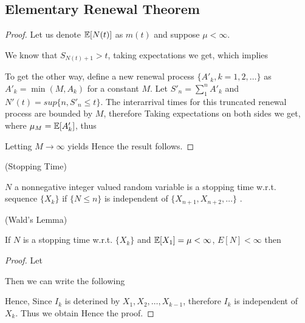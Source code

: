 \documentclass[all-lectures.tex]{subfiles}
\begin{document}
\subsection{Elementary Renewal Theorem}
\begin{thm}
\end{thm}

\begin{proof}
Let us denote $\mathbb{E}[N(t)]$ as $m(t)$ and suppose $\mu < \infty$.

We know that $S_{N(t)+1} > t$, taking expectations we get,
which implies 

To get the other way, define a new renewal process $\{ A'_k, k=1,2,\dots \}$ as $A'_k= \min(M,A_k)$ for a constant $M$.
Let $S'_n=\sum_1^n A'_k$ and $N'(t) = sup\{n,S'_n \le t\}$. The interarrival times for this truncated renewal process are bounded by $M$, therefore
Taking expectations on both sides we get,
where $\mu_M = \mathbb{E}[A'_k]$, thus

Letting $M \to \infty$ yields
Hence the result follows.
\end{proof}

\begin{defn}
(Stopping Time)

$N$ a nonnegative integer valued random variable is a stopping time w.r.t. sequence $\{X_k\}$ if $\{ N\le n\}$ is independent of $\{X_{n+1}, X_{n+2}, \dots\}$ .
\end{defn}

\begin{thm}
(Wald's Lemma)

If $N$ is a stopping time w.r.t. $\{X_k\}$ and $\mathbb{E}[X_1] = \mu < \infty$, $E[N] < \infty$ then
\end{thm}

\begin{proof}
Let 

Then we can write the following

Hence,
Since $I_k$ is deterined by $X_1, X_2, \dots, X_{k-1}$, therefore $I_k$ is independent of $X_k$. Thus we obtain
Hence the proof.
\end{proof}
\end{document}

